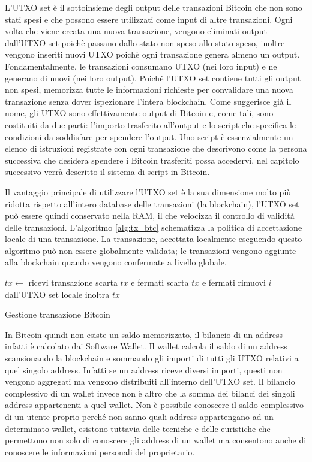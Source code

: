 L'UTXO set è il sottoinsieme degli output delle transazioni Bitcoin che non sono stati spesi e che possono essere utilizzati come input di altre transazioni. Ogni volta che viene creata una nuova transazione, vengono eliminati output dall'UTXO set poichè passano dallo stato non-speso allo stato speso, inoltre vengono inseriti nuovi UTXO poichè ogni transazione genera almeno un output. Fondamentalmente, le transazioni consumano UTXO (nei loro input) e ne generano di nuovi (nei loro output). Poiché l'UTXO set contiene tutti gli output non spesi, memorizza tutte le informazioni richieste per convalidare una nuova transazione senza dover ispezionare l'intera blockchain. Come suggerisce già il nome, gli UTXO sono effettivamente output di Bitcoin e, come tali, sono costituiti da due parti: l'importo trasferito all'output e lo script che specifica le condizioni da soddisfare per spendere l'output. Uno script è essenzialmente un elenco di istruzioni registrate con ogni transazione che descrivono come la persona successiva che desidera spendere i Bitcoin trasferiti possa accedervi, nel capitolo successivo verrà descritto il sistema di script in Bitcoin.

Il vantaggio principale di utilizzare l'UTXO set è la sua dimensione molto più ridotta rispetto all'intero database delle transazioni (la blockchain), l'UTXO set può essere quindi conservato nella RAM, il che velocizza il controllo di validità delle transazioni. L'algoritmo \ref{alg:tx_btc} schematizza la politica di accettazione locale di una transazione. La transazione, accettata localmente eseguendo questo algoritmo può non essere globalmente validata; le transazioni vengono aggiunte alla blockchain quando vengono confermate a livello globale.
\begin{algorithm}
\begin{algorithmic}
\State $tx \gets$ ricevi transazione
        \State scarta $tx$ e fermati
    \EndIf
\EndFor
{}
    \State scarta $tx$ e fermati
\EndIf
{}
    \State rimuovi $i$ dall'UTXO set locale
\EndFor
\State inoltra $tx$
\end{algorithmic}
\caption{Gestione transazione Bitcoin}
\label{alg:tx_btc}
\end{algorithm}
\FloatBarrier
In Bitcoin quindi non esiste un saldo memorizzato, il bilancio di un address infatti è calcolato dai Software Wallet. Il wallet calcola il saldo di un address scansionando la blockchain e sommando gli importi di tutti gli UTXO relativi a quel singolo address. Infatti se un address riceve diversi importi, questi non vengono aggregati ma vengono distribuiti all'interno dell'UTXO set. Il bilancio complessivo di un wallet invece non è altro che la somma dei bilanci dei singoli address appartenenti a quel wallet. 
Non è possibile conoscere il saldo complessivo di un utente proprio perché non sanno quali address appartengano ad un determinato wallet, esistono tuttavia delle tecniche e delle euristiche che permettono non solo di conoscere gli address di un wallet ma consentono anche di conoscere le informazioni personali del proprietario.

